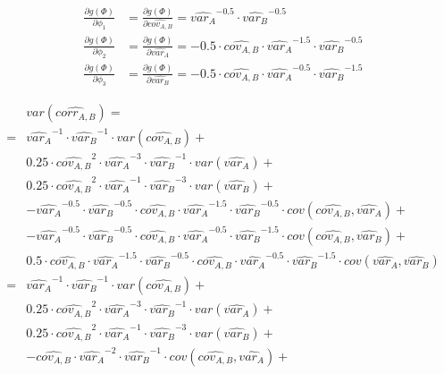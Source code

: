 \[
\begin{split}
\frac{\partial g(\Phi)}{\partial \phi_1}&=\frac{\partial g(\Phi)}{\partial \hat{cov_{A,B}}} =\hat{var_{A}}^{-0.5} \cdot \hat{var_{B}}^{-0.5}\\
\frac{\partial g(\Phi)}{\partial \phi_2}&=\frac{\partial g(\Phi)}{\partial \hat{var_{A}}} = -0.5 \cdot \hat{cov_{A,B}}\cdot \hat{var_{A}}^{-1.5} \cdot \hat{var_{B}}^{-0.5}\\
\frac{\partial g(\Phi)}{\partial \phi_3}&=\frac{\partial g(\Phi)}{\partial \hat{var_{B}}} = -0.5 \cdot \hat{cov_{A,B}}\cdot \hat{var_{A}}^{-0.5} \cdot \hat{var_{B}}^{-1.5}
\end{split}
\]

\[
\begin{split}
&var\left(\hat{corr_{A,B}}\right)=\\
=&\hat{var_{A}}^{-1} \cdot \hat{var_{B}}^{-1}\cdot var\left(\hat{cov_{A,B}} \right)+\\
& 0.25 \cdot \hat{cov_{A,B}}^2\cdot \hat{var_{A}}^{-3} \cdot \hat{var_{B}}^{-1}\cdot var\left(\hat{var_{A}} \right)+\\
& 0.25 \cdot \hat{cov_{A,B}}^2\cdot \hat{var_{A}}^{-1} \cdot \hat{var_{B}}^{-3}\cdot var\left(\hat{var_{B}} \right)+\\
& - \hat{var_{A}}^{-0.5} \cdot \hat{var_{B}}^{-0.5} \cdot \hat{cov_{A,B}}\cdot \hat{var_{A}}^{-1.5} \cdot \hat{var_{B}}^{-0.5} \cdot cov\left(\hat{cov_{A,B}},\hat{var_{A}}\right)+\\
& - \hat{var_{A}}^{-0.5} \cdot \hat{var_{B}}^{-0.5} \cdot \hat{cov_{A,B}}\cdot \hat{var_{A}}^{-0.5} \cdot \hat{var_{B}}^{-1.5} \cdot cov\left(\hat{cov_{A,B}},\hat{var_{B}}\right)+\\
& 0.5 \cdot \hat{cov_{A,B}}\cdot \hat{var_{A}}^{-1.5} \cdot \hat{var_{B}}^{-0.5}\cdot \hat{cov_{A,B}}\cdot \hat{var_{A}}^{-0.5} \cdot \hat{var_{B}}^{-1.5}\cdot cov\left(\hat{var_{A}},\hat{var_{B}}\right)\\
=&\hat{var_{A}}^{-1} \cdot \hat{var_{B}}^{-1}\cdot var\left(\hat{cov_{A,B}} \right)+\\
& 0.25 \cdot \hat{cov_{A,B}}^2\cdot \hat{var_{A}}^{-3} \cdot \hat{var_{B}}^{-1}\cdot var\left(\hat{var_{A}} \right)+\\
& 0.25 \cdot \hat{cov_{A,B}}^2\cdot \hat{var_{A}}^{-1} \cdot \hat{var_{B}}^{-3}\cdot var\left(\hat{var_{B}} \right)+\\
& - \hat{cov_{A,B}} \cdot \hat{var_{A}}^{-2} \cdot \hat{var_{B}}^{-1} \cdot cov\left(\hat{cov_{A,B}},\hat{var_{A}}\right)+\\

\end{split}\]
